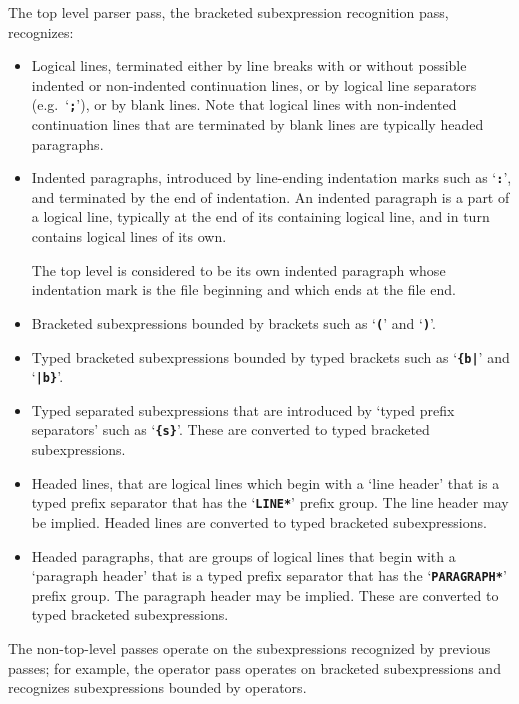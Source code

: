 \documentclass[12pt]{article}
\newcommand{\TT}[1]{{\tt \bfseries #1}}
\begin{document}
The top level parser pass, the bracketed subexpression recognition pass,
recognizes:
\begin{itemize}

\item Logical lines, terminated either by line breaks with or without
possible indented or non-indented
continuation lines, or by logical line separators
(e.g.~`\TT{;}'), or by blank lines.  Note that logical
lines with non-indented continuation lines that are
terminated by blank lines are typically headed paragraphs.

\item Indented paragraphs, introduced by line-ending
indentation marks such as `\TT{:}', and terminated by the end of indentation.
An indented paragraph is a part of a logical
line, typically at the end of its containing logical line,
and in turn contains logical lines of its own.

The top level is considered to be its own indented paragraph whose
indentation mark is the file beginning and which ends at the file end.

\item Bracketed subexpressions bounded by brackets
such as `\TT{(}' and `\TT{)}'.

\item Typed bracketed subexpressions bounded by typed brackets
such as `\TT{\{b|}' and `\TT{|b\}}'.

\item Typed separated subexpressions that are introduced by 
`typed prefix separators' such as `\TT{\{s\}}'.
These are converted to typed bracketed subexpressions.

\item Headed lines, that are logical lines which begin with
a `line header' that is
a typed prefix separator that has the `\TT{*LINE*}' prefix group.
The line header may be implied.
Headed lines are converted to typed bracketed subexpressions.

\item Headed paragraphs, that are groups of logical lines
that begin with a `paragraph header' that is
a typed prefix separator that has the `\TT{*PARAGRAPH*}' prefix group.
The paragraph header may be implied.
These are converted to typed bracketed subexpressions.

\end{itemize}

The non-top-level passes
operate on the subexpressions recognized by previous passes;
for example, the operator pass operates on bracketed subexpressions
and recognizes
subexpressions bounded by operators.
\end{document}
